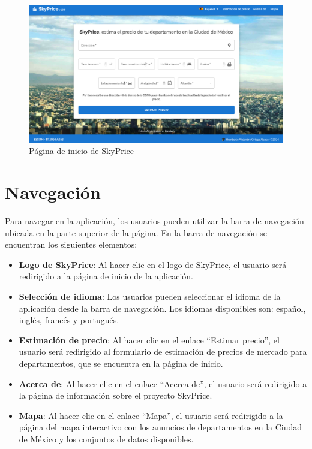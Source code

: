 \begin{figure}[H]
  \centering
  \includegraphics[width=1.0\textwidth]{imagenes/02-requerimientos/skyprice-home.png}
  \caption{Página de inicio de SkyPrice}
  \label{fig:skyprice-home}
\end{figure}

\section{Navegación}
Para  navegar en la aplicación, los usuarios pueden utilizar la barra de navegación
ubicada en la parte superior de la página. En la barra de navegación se encuentran
los siguientes elementos:

\begin{itemize}
\item \textbf{Logo de SkyPrice}: Al hacer clic en el logo de SkyPrice, el usuario será
redirigido a la página de inicio de la aplicación.
\item \textbf{Selección de idioma}: Los usuarios pueden seleccionar el idioma de la aplicación
desde la barra de navegación. Los idiomas disponibles son: español, inglés, francés y portugués.
\item \textbf{Estimación de precio}: Al hacer clic en el enlace ``Estimar precio'', el usuario
será redirigido al formulario de estimación de precios de mercado para departamentos, que se
encuentra en la página de inicio.
\item \textbf{Acerca de}: Al hacer clic en el enlace ``Acerca de'', el usuario será redirigido
a la página de información sobre el proyecto SkyPrice.
\item \textbf{Mapa}: Al hacer clic en el enlace ``Mapa'', el usuario será redirigido a la página
del mapa interactivo con los anuncios de departamentos en la Ciudad de México y
los conjuntos de datos disponibles.
\end{itemize}

